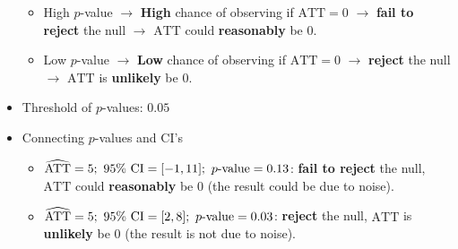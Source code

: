 \documentclass[10pt, letterpaper]{article}
\def\ATT{\mathrm{ATT}}
\def\CI{\mathrm{CI}}
\begin{document}
\begin{multicols}{2}
\begin{itemize}
\begin{itemize}
		\item High $p$-value $\rightarrow$ \textbf{High} chance of observing if $\ATT=0$ $\rightarrow$ \textbf{fail to reject} the null $\rightarrow$ $\ATT$ could \textbf{reasonably} be $0$.
		\item Low $p$-value $\rightarrow$ \textbf{Low} chance of observing if $\ATT=0$ $\rightarrow$ \textbf{reject} the null $\rightarrow$ $\ATT$ is \textbf{unlikely} be $0$.
	\end{itemize}
	\item Threshold of $p$-values: $0.05$
	\item Connecting $p$-values and $\CI$'s
	\begin{itemize}
		\item $\widehat{\ATT}=5;\ 95\%\ \CI=\qty[-1,11];\ p\text{-value}=0.13$: \textbf{fail to reject} the null, $\ATT$ could \textbf{reasonably} be $0$ (the result could be due to noise).
		\item $\widehat{\ATT}=5;\ 95\%\ \CI=\qty[2,8];\ p\text{-value}=0.03$: \textbf{reject} the null, $\ATT$ is \textbf{unlikely} be $0$ (the result is not due to noise).
	\end{itemize}
\end{itemize}


\end{multicols}
\end{document}
